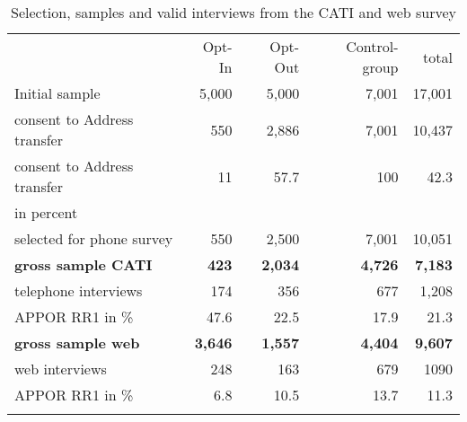 \begin{table}[h]
	\caption{Selection, samples and valid interviews from the CATI and web survey}
	\begin{tabularx}{\textwidth}{Xrrrr}
		\addlinespace
		& Opt-In& Opt-Out& Control-group& total \\ \addlinespace
		\midrule
		Initial sample& 5,000& 5,000 & 7,001& 17,001 \\ \addlinespace
		consent to Address transfer & 550& 2,886& 7,001& 10,437 \\ \addlinespace
		consent to Address transfer & 11& 57.7& 100 & 42.3 \\
		in percent & & & & \\ \addlinespace
		selected for phone survey& 550& 2,500& 7,001& 10,051 \\ \addlinespace
		\bf{gross sample CATI}&\bf{423}&\bf{2,034}&\bf{4,726}&\bf{7,183} \\ \addlinespace
		telephone interviews& 174& 356& 677& 1,208 \\ \addlinespace
		APPOR RR1 in  \%& 47.6& 22.5&17.9& 21.3 \\ \addlinespace
		\bf{gross sample web} & \bfseries{3,646}&\bf{1,557} & \bf{4,404}& \bf{9,607} \\ \addlinespace
		web interviews&248&163&679&1090 \\ \addlinespace
		APPOR RR1 in  \%&6.8&10.5&13.7&11.3 \\ \addlinespace
		\bottomrule
		\label{tab:sample}
	\end{tabularx}
\end{table}
